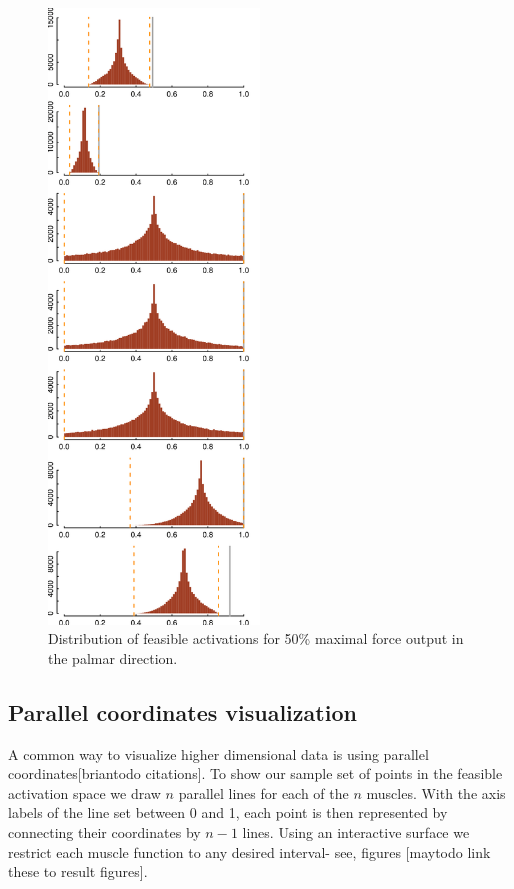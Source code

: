 \begin{figure}[htbp]
\centering
\includegraphics[width=0.5\textwidth]{sections/figs/raw_histograms.png}
\caption{Distribution of feasible activations for 50\% maximal force output in the palmar direction.}
\label{fig:raw_histograms}
\end{figure}

\subsection{Parallel coordinates visualization}
A common way to visualize higher dimensional data is using parallel coordinates[briantodo citations]. To show our sample set of points in the feasible activation space we draw $n$ parallel lines for each of the $n$ muscles. With the axis labels of the line set between 0 and 1, each point is then represented by connecting their coordinates by $n-1$ lines. Using an interactive surface we restrict each muscle function to any desired interval- see, figures [maytodo link these to result figures].

